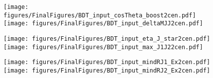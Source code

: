 \documentclass[PAPER, american,coverpage,texlive=2016, english]{\ATLASLATEXPATH atlasdoc}
\providecommand{\DIFaddbeginFL}{} %
\providecommand{\DIFaddendFL}{} %
\providecommand{\DIFdelbeginFL}{} %
\providecommand{\DIFdelendFL}{} %
\begin{document}
\begin{figure}[htbp]
  \centering

  \DIFdelbeginFL %
\DIFdelendFL \DIFaddbeginFL \texttt{[image: figures/FinalFigures/BDT\_input\_cosTheta\_boost2cen.pdf]}
  \texttt{[image: figures/FinalFigures/BDT\_input\_deltaMJJ2cen.pdf]}

\DIFaddendFL 

  \DIFdelbeginFL %
\DIFdelendFL \DIFaddbeginFL \texttt{[image: figures/FinalFigures/BDT\_input\_eta\_J\_star2cen.pdf]}
  \texttt{[image: figures/FinalFigures/BDT\_input\_max\_J1J22cen.pdf]}

\DIFaddendFL 

  \DIFdelbeginFL %
\DIFdelendFL \DIFaddbeginFL \texttt{[image: figures/FinalFigures/BDT\_input\_mindRJ1\_Ex2cen.pdf]}
  \texttt{[image: figures/FinalFigures/BDT\_input\_mindRJ2\_Ex2cen.pdf]}

\DIFaddendFL 


\end{figure}
\end{document}

